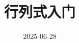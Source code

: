\newcommand\EbleEstasAsterisko{}%
\let\EbleEstasAsterisko\relax
\renewcommand\thesection{\EbleEstasAsterisko\thechapter.\arabic{section}}
\newcommand\KunAsteriskoEnEnhavtabelo{%
    \addtocontents{toc}%
    {\def\EbleEstasAsterisko{\let\EbleEstasAsterisko\relax\string\llap{*}}}%
}
\newcommand\SenAsteriskoEnEnhavtabelo{%
    \addtocontents{toc}%
    {\def\EbleEstasAsterisko{\let\EbleEstasAsterisko\relax}}%
}

\usepackage{xurl}

\providecommand*{\tridet}{}
\renewcommand*{\tridet}{}

\usepackage[%
    breaklinks,
    hidelinks,
    unicode
]{hyperref}


\title{行列式入门}
\author{}
\date{2025-06-28}

\makeatletter
\let\latitolo\@title
\let\laauxtoro\@author
\let\ladato\@date
\makeatother

\newcommand*{\lajaro}{2025}

\newcommand{\inscribe}[2]{
    \ifdeflength{\namelen}{}{\newlength{\namelen}}
    \ifdeflength{\datelen}{}{\newlength{\datelen}}
    \ifdeflength{\maxlen}{}{\newlength{\maxlen}}
    \settowidth{\namelen}{#1}
    \settowidth{\datelen}{#2}
    \ifdimgreater{\namelen}{\datelen}{\setlength{\maxlen}{\namelen}}{\setlength{\maxlen}{\datelen}}
    \hfill%
    \begin{minipage}[r]{\maxlen}
        \makebox[\maxlen][r]{#1} \\
        \makebox[\maxlen][r]{#2}
    \end{minipage}
}

